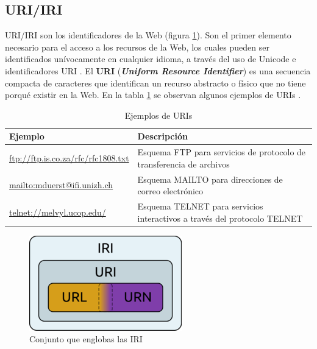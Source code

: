 
\subsection{URI/IRI}

URI/IRI son los identificadores de la Web (figura \ref{fig:250px-irivenndiagramm}). Son el primer elemento necesario para el acceso a los recursos de la Web, los cuales pueden ser identificados unívocamente en cualquier idioma, a través del uso de Unicode e identificadores URI \cite{aplicacion}. El \textbf{URI} (\textit{\textbf{Uniform Resource Identifier}}) es una secuencia compacta de caracteres que identifican un recurso abstracto o físico que no tiene porqué existir en la Web. En la tabla \ref{uris} se observan algunos ejemplos de URIs \cite{uri}.



\begin{table}[H]
	\caption{Ejemplos de URIs}
	\label{uris}
	\centering
	\begin{tabular}{|m{5.6cm}|m{5.6cm}|}
		\rowcolor[HTML]{EFEFEF} 
		\hline
		Ejemplo & Descripción \\ \hline
		\url{ftp://ftp.is.co.za/rfc/rfc1808.txt} & Esquema FTP para servicios de protocolo de transferencia de archivos\\ \hline
		\url{mailto:mduerst@ifi.unizh.ch} & Esquema MAILTO para direcciones de correo electrónico \\ \hline
		\url{telnet://melvyl.ucop.edu/} & Esquema TELNET para servicios interactivos a través del protocolo TELNET\\ \hline
	\end{tabular}
\end{table}

\begin{figure}[H]
	\centering
	\includegraphics[width=0.33\linewidth]{imagenes/capitulo3/URI}
	\caption{Conjunto que englobas las IRI \cite{imagen-iri}}
	\label{fig:250px-irivenndiagramm}
\end{figure}


